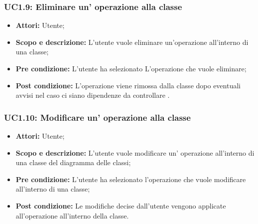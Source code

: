 \documentclass[a4paper]{report}
\begin{document}
\subsubsection{UC1.9: Eliminare un' operazione  alla classe}
\begin{itemize}
	\item \textbf{Attori:} Utente;
	\item \textbf{Scopo e descrizione: }L'utente vuole eliminare un'operazione all'interno di una classe;
	\item \textbf{Pre condizione: }L'utente ha selezionato L'operazione che vuole eliminare;
	\item \textbf{Post condizione: }L'operazione viene rimossa dalla classe dopo eventuali avvisi nel caso ci siano dipendenze da controllare .
\end{itemize}

\subsubsection{UC1.10: Modificare un' operazione alla classe}
\begin{itemize}
	\item \textbf{Attori:} Utente;
	\item \textbf{Scopo e descrizione: }L'utente vuole modificare un' operazione all'interno di una classe del diagramma delle classi;
	\item \textbf{Pre condizione: }L'utente ha selezionato l'operazione che vuole modificare all'interno di una classe;
	\item \textbf{Post condizione: }Le modifiche decise dall'utente vengono applicate all'operazione all'interno della classe.
\end{itemize}
\end{document}
